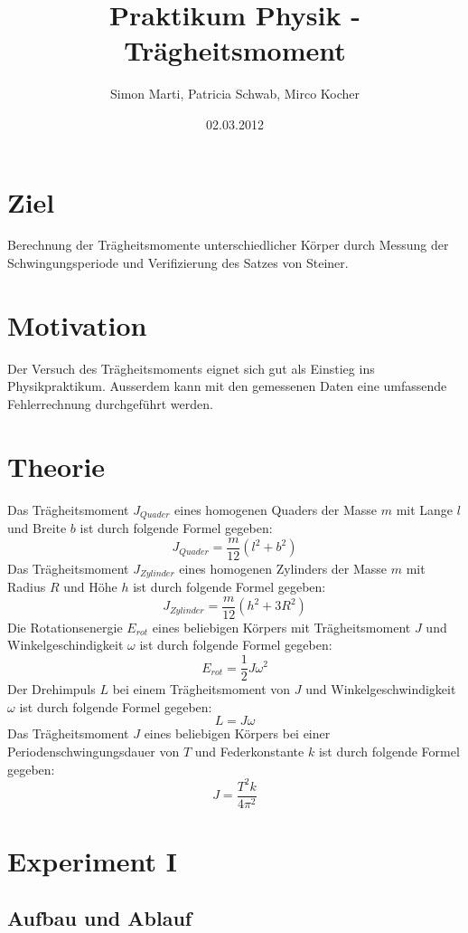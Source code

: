 \documentclass[12pt,a4paper]{article}
\title{Praktikum Physik - Tr\"agheitsmoment}
\author{Simon Marti, Patricia Schwab, Mirco Kocher}
\date{02.03.2012}
\begin{document}
\maketitle

\section*{Ziel}
Berechnung der Tr\"agheitsmomente unterschiedlicher K\"orper durch Messung der Schwingungsperiode und Verifizierung des Satzes von Steiner.

\section*{Motivation}
Der Versuch des Tr\"agheitsmoments eignet sich gut als Einstieg ins Physikpraktikum. Ausserdem kann mit den gemessenen Daten eine umfassende Fehlerrechnung durchgef\"uhrt werden.

\section*{Theorie}
Das Tr\"agheitsmoment $J_{Quader}$ eines homogenen Quaders der Masse $m$ mit Lange $l$ und Breite $b$ ist durch folgende Formel gegeben:
\[ J_{Quader} = \frac{m}{12}(l^2 + b^2) \]
Das Tr\"agheitsmoment $J_{Zylinder}$ eines homogenen Zylinders der Masse $m$ mit Radius $R$ und H\"ohe $h$ ist durch folgende Formel gegeben:
\[  J_{Zylinder} = \frac{m}{12}(h^2 + 3R^2) \]
Die Rotationsenergie $E_{rot}$ eines beliebigen K\"orpers mit Tr\"agheitsmoment $J$ und Winkelgeschindigkeit $\omega$ ist durch folgende Formel gegeben:
\[ E_{rot} = \frac{1}{2}J\omega^2 \]
Der Drehimpuls $L$ bei einem Tr\"agheitsmoment von $J$ und Winkelgeschwindigkeit $\omega$ ist durch folgende Formel gegeben:
\[ L = J\omega \]
Das Tr\"agheitsmoment $J$ eines beliebigen K\"orpers bei einer Periodenschwingungsdauer von $T$ und Federkonstante $k$ ist durch folgende Formel gegeben:
\[ J = \frac{T^2k}{4\pi^2} \]

\section*{Experiment I}

\subsection*{Aufbau und Ablauf}
\end{document}
